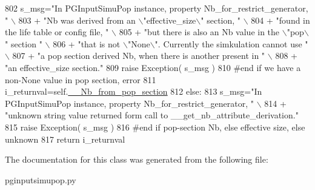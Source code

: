 \begin{DoxyCode}
802                 s\_msg=\textcolor{stringliteral}{"In PGInputSimuPop instance, property Nb\_for\_restrict\_generator, "} \(\backslash\)
803                         + \textcolor{stringliteral}{"Nb was derived from an \(\backslash\)"effective\_size\(\backslash\)" section, "} \(\backslash\)
804                         + \textcolor{stringliteral}{"found in the life table or config file, "} \(\backslash\)
805                         + \textcolor{stringliteral}{"but there is also an Nb value in the \(\backslash\)"pop\(\backslash\)" section "} \(\backslash\)
806                         + \textcolor{stringliteral}{"that is not \(\backslash\)"None\(\backslash\)".  Currently the simkulation cannot use "} \(\backslash\)
807                         + \textcolor{stringliteral}{"a pop section derived Nb, when there is another present in "} \(\backslash\)
808                         + \textcolor{stringliteral}{"an effective\_size section."}
809                 \textcolor{keywordflow}{raise} Exception( s\_msg )
810             \textcolor{comment}{#end if we have a non-None value in pop section, error}
811             i\_returnval=self.\hyperlink{classnegui_1_1pginputsimupop_1_1PGInputSimuPop_a2525ee53b93e309b99914e0cdf175901}{\_\_Nb\_from\_pop\_section}
812         \textcolor{keywordflow}{else}:
813             s\_msg=\textcolor{stringliteral}{"In PGInputSimuPop instance, property Nb\_for\_restrict\_generator, "} \(\backslash\)
814                     + \textcolor{stringliteral}{"unknown string value returned form call to \_\_get\_nb\_attribute\_derivation."} 
815             \textcolor{keywordflow}{raise} Exception( s\_msg )
816         \textcolor{comment}{#end if pop-section Nb, else effective size, else unknown}
817         \textcolor{keywordflow}{return} i\_returnval
\end{DoxyCode}


The documentation for this class was generated from the following file\+:\begin{DoxyCompactItemize}
\item 
pginputsimupop.\+py\end{DoxyCompactItemize}
